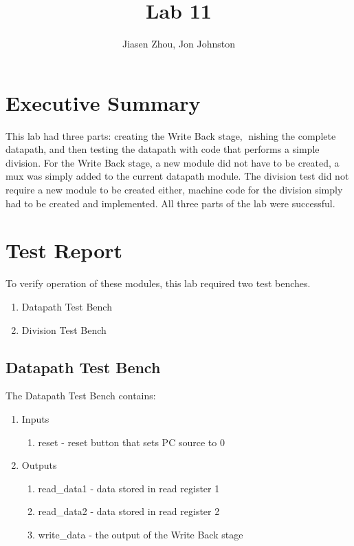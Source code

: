 \documentclass{article}
\author{Jiasen Zhou, Jon Johnston}
\title{Lab 11}
\begin{document}
\maketitle

\section{Executive Summary}
This lab had three parts: creating the Write Back stage, nishing the complete datapath, and then testing the datapath with code that performs a simple division. For the Write Back stage, a new module did not have to be created, a mux was simply added to the current datapath module. The division test did not require a new module to be created either, machine code for the division simply had to be created and implemented. All three parts of the lab were successful.

\section{Test Report}
To verify operation of these modules, this lab required two test benches. 
\begin{enumerate}
	\item Datapath Test Bench
	\item Division Test Bench
\end{enumerate}

\subsection{Datapath Test Bench}
The Datapath Test Bench contains:
\begin{enumerate}
	\item Inputs
	\begin{enumerate}
		\item reset - reset button that sets PC source to 0
	\end{enumerate}	
	\item Outputs
	\begin{enumerate}	
		\item read\_data1 - data stored in read register 1
		\item read\_data2 - data stored in read register 2
		\item write\_data - the output of the Write Back stage 
	\end{enumerate}
\end{enumerate} 
\end{document}
